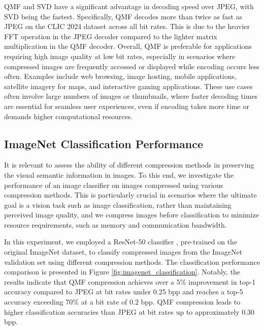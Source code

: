 QMF and SVD have a significant advantage in decoding speed over JPEG, with SVD being the fastest. Specifically, QMF decodes more than twice as fast as JPEG on the CLIC 2024 dataset across all bit rates. This is due to the heavier FFT operation in the JPEG decoder compared to the lighter matrix multiplication in the QMF decoder. Overall, QMF is preferable for applications requiring high image quality at low bit rates, especially in scenarios where compressed images are frequently accessed or displayed while encoding occurs less often. Examples include web browsing, image hosting, mobile applications, satellite imagery for maps, and interactive gaming applications. These use cases often involve large numbers of images or thumbnails, where faster decoding times are essential for seamless user experiences, even if encoding takes more time or demands higher computational resources.


\subsection{ImageNet Classification Performance} \label{sec:imagenet_classification_performance}

It is relevant to assess the ability of different compression methods in preserving the visual semantic information in images. To this end, we investigate the performance of an image classifier on images compressed using various compression methods. This is particularly crucial in scenarios where the ultimate goal is a vision task such as image classification, rather than maintaining perceived image quality, and we compress images before classification to minimize resource requirements, such as memory and communication bandwidth.

In this experiment, we employed a ResNet-50 classifier \cite{he2016deep}, pre-trained on the original ImageNet \cite{deng2009imagenet} dataset, to classify compressed images from the ImageNet validation set using different compression methods. The classification performance comparison is presented in Figure \ref{fig:imagenet_classification}. Notably, the results indicate that QMF compression achieves over a 5\% improvement in top-1 accuracy compared to JPEG at bit rates under 0.25 bpp and reaches a top-5 accuracy exceeding 70\% at a bit rate of 0.2 bpp. QMF compression leads to higher classification accuracies than JPEG at bit rates up to approximately 0.30 bpp. 

